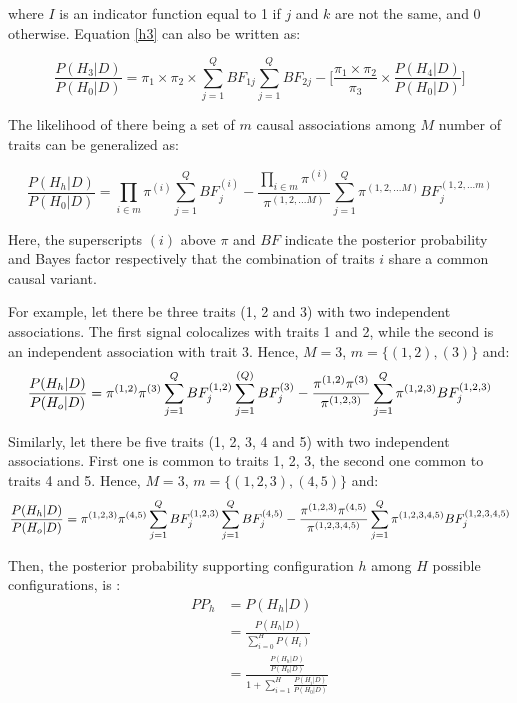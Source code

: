 \documentclass{article}
\begin{document}
\noindent where $I$ is an indicator function equal to 1 if $j$ and $k$ are not the same, and 0 otherwise. Equation \ref{h3} can also be written as:

\begin{equation}
\frac{P(H_3|D)}{P(H_0|D)} = \pi_1 \times \pi_2 \times \sum_{j=1}^Q BF_{1j} \sum_{j=1}^Q BF_{2j} - \bigg[\frac{\pi_1 \times \pi_2}{\pi_3} \times \frac{P(H_4|D)}{P(H_0|D)} \bigg]
\end{equation}

\noindent The likelihood of there being a set of $m$ causal associations among $M$ number of traits can be generalized as:

\begin{equation}
\frac{P(H_h|D)}{P(H_0|D)} = \prod_{i \in m} \pi^{(i)} \sum_{j=1}^Q BF_j^{(i)} - \frac{\prod_{i \in m} \pi^{(i)}}{\pi^{(1,2,...M)}} \sum_{j=1}^Q \pi^{(1,2,...M)} BF_j^{(1,2,...m)}
\end{equation}

\noindent Here, the superscripts $(i)$ above $\pi$ and $BF$ indicate the posterior probability and Bayes factor respectively that the combination of traits $i$ share a common causal variant.

For example, let there be three traits (1, 2 and 3) with two independent associations. The first signal colocalizes with traits 1 and 2, while the second is an independent association with trait 3. Hence, $M = 3$, $m = \big\{(1,2),(3)\big\}$ and:
\begin{equation}
\frac{P(H_h|D)}{P(H_o|D)} = \pi^{(1,2)} \pi^{(3)} \sum_{j=1}^{Q} BF_j^{(1,2)} \sum_{j=1}^{(Q)} BF_j^{(3)} - \frac{\pi^{(1,2)} \pi^{(3)}}{\pi^{(1,2,3)}} \sum_{j=1}^Q \pi^{(1,2,3)} BF_j^{(1,2,3)}\\
\end{equation}

\noindent Similarly, let there be five traits (1, 2, 3, 4 and 5) with two independent associations. First one is common to traits 1, 2, 3, the second one common to traits 4 and 5. Hence, $M = 3$, $m = \big\{(1,2,3),(4,5)\}$ and:
\begin{equation}
\frac{P(H_h|D)}{P(H_o|D)} = \pi^{(1,2,3)} \pi^{(4,5)} \sum_{j=1}^{Q} BF_j^{(1,2,3)} \sum_{j=1}^{Q} BF_j^{(4,5)} - \frac{\pi^{(1,2,3)} \pi^{(4,5)} }{\pi^{(1,2,3,4,5)}} \sum_{j=1}^Q \pi^{(1,2,3,4,5)} BF_j^{(1,2,3,4,5)}\\
\end{equation}

Then, the posterior probability supporting configuration $h$ among $H$ possible configurations, is \citep{Giambartolomei:2014aa}:
\begin{align}
PP_h &= P(H_h | D) \\
&= \frac{P(H_h | D)}{\sum_{i=0}^H P(H_i)} \\
&= \frac{\frac{P(H_h | D)}{P(H_0|D)}}{1 + \sum_{i=1}^H \frac{P(H_i|D)}{P(H_0|D)}}
\end{align}
\end{document}
